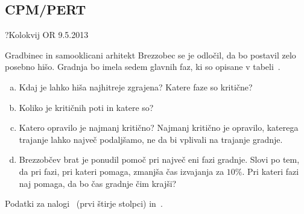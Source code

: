 \subsection{CPM/PERT}

\begin{naloga}{?}{Kolokvij OR 9.5.2013}
\begin{vprasanje}[brezzobec]
Gradbinec in samooklicani arhitekt Brezzobec se je odločil,
da bo postavil zelo posebno hišo.
Gradnja bo imela sedem glavnih faz,
ki so opisane v tabeli~\tab{}.
\begin{enumerate}[(a)]
\item Kdaj je lahko hiša najhitreje zgrajena?
Katere faze so kritične?
\item Koliko je kritičnih poti in katere so?
\item Katero opravilo je najmanj kritično?
Najmanj kritično je opravilo, katerega trajanje lahko največ podaljšamo,
ne da bi vplivali na trajanje gradnje.
\item Brezzobčev brat je ponudil pomoč pri največ eni fazi gradnje.
Slovi po tem, da pri fazi, pri kateri pomaga, zmanjša čas izvajanja za $10\%$.
Pri kateri fazi naj pomaga, da bo čas gradnje čim krajši?
\end{enumerate}

\begin{tabela}
\caption{Podatki za nalogi~\nal{} (prvi štirje stolpci)
in~.}
\end{tabela}
\end{vprasanje}
\begin{odgovor}
\end{odgovor}
\end{naloga}


